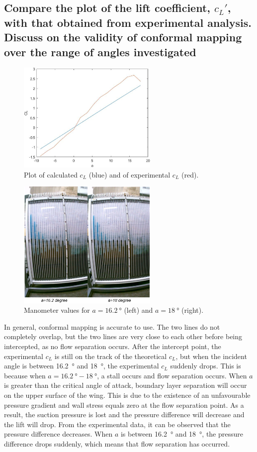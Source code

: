 \documentclass[11pt]{article}
\begin{document}
\subsection*{Compare the plot of the lift coefficient, $c_L'$, with that obtained from experimental analysis. Discuss on the validity of conformal mapping over the range of angles investigated}
\begin{figure}[H]
  \centering
  \includegraphics[width=0.6\textwidth]{./img/diagram13.png}
  \caption{Plot of calculated $c_L$ (blue) and of experimental $c_L$ (red).}
\end{figure}
\begin{figure}[H]
  \centering
  \includegraphics[width=0.6\textwidth]{./img/diagram14.png}
  \caption{Manometer values for $a=\SI{16.2}{\degree}$ (left) and $a = \SI{18}{\degree}$ (right).}
\end{figure}
In general, conformal mapping is accurate to use. The two lines do not completely overlap, but the two lines are very close to each other before being intercepted, as no flow separation occurs. After the intercept point, the experimental $c_L$ is still on the track of the theoretical $c_L$, but when the incident angle is between \SI{16.2}{\degree} and \SI{18}{\degree}, the experimental $c_L$ suddenly drops. This is because when $a=\SI{16.2}{\degree}-\SI{18}{\degree}$, a stall occurs and flow separation occurs. When $a$ is greater than the critical angle of attack, boundary layer separation will occur on the upper surface of the wing. This is due to the existence of an unfavourable pressure gradient and wall stress equals zero at the flow separation point. As a result, the suction pressure is lost and the pressure difference will decrease and the lift will drop. From the experimental data, it can be observed that the pressure difference decreases. When $a$ is between \SI{16.2}{\degree} and \SI{18}{\degree}, the pressure difference drops suddenly, which means that flow separation has occurred.
\end{document}
